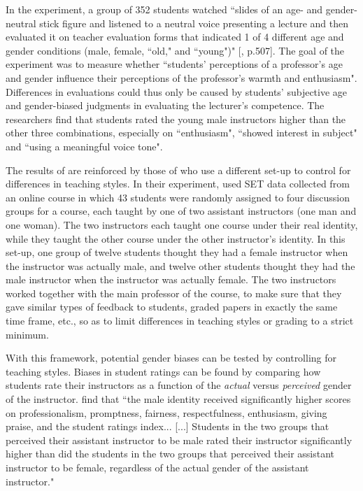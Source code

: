 \documentclass[12pt]{article}
\begin{document}
In the \citet{Arbuckle2003} experiment, a group of 352 students watched \textquotedblleft slides of an age- and gender-neutral stick figure and listened to a neutral voice presenting a lecture and then evaluated it on teacher evaluation forms that indicated 1 of 4 different age and gender conditions (male, female, \textquotedblleft old," and \textquotedblleft young")" [\citealp{Arbuckle2003}, p.507]. The goal of the experiment was to measure whether \textquotedblleft students' perceptions of a professor's age and gender influence their perceptions of the professor's warmth and enthusiasm". Differences in evaluations could thus only be caused by students' subjective age and gender-biased judgments in evaluating the lecturer's competence. The researchers find that students rated the young male instructors higher than the other three combinations, especially on \textquotedblleft enthusiasm", \textquotedblleft showed interest in subject"  and \textquotedblleft using a meaningful voice tone". 

The results of \citet{Arbuckle2003} are reinforced by those of \citet{MacNell2014} who use a different set-up to control for differences in teaching styles. In their experiment, \citet{MacNell2014} used SET data collected from an online course in which 43 students were randomly assigned to four discussion groups for a course, each taught by one of two assistant instructors (one man and one woman). The two instructors each taught one course under their real identity, while they taught the other course under the other instructor's identity. In this set-up, one group of twelve students thought they had a female instructor when the instructor was actually male, and twelve other students thought they had the male instructor when the instructor was actually female. The two instructors worked together with the main professor of the course, to make sure that they gave similar types of feedback to students, graded papers in exactly the same time frame, etc., so as to limit differences in teaching styles or grading to a strict minimum. 

With this framework, potential gender biases can be tested by controlling for teaching styles. Biases in student ratings can be found by comparing how students rate their instructors as a function of the \textit{actual} versus \textit{perceived} gender of the instructor. \citet{MacNell2014} find that ``the male identity received significantly higher scores on professionalism, promptness, fairness, respectfulness, enthusiasm, giving praise, and the
student ratings index... [...] Students in the two groups that perceived their assistant
instructor to be male rated their instructor significantly higher than did the students in the
two groups that perceived their assistant instructor to be female, regardless of the actual gender
of the assistant instructor." 
\end{document}
